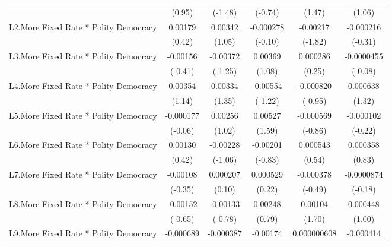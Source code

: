 {\begin{longtable}{l*{5}{c}}
                &   (0.95)         &  (-1.48)         &  (-0.74)         &   (1.47)         &   (1.06)         \\
[1em]
L2.More Fixed Rate * Polity Democracy&  0.00179         &  0.00342         &-0.000278         & -0.00217         &-0.000216         \\
                &   (0.42)         &   (1.05)         &  (-0.10)         &  (-1.82)         &  (-0.31)         \\
[1em]
L3.More Fixed Rate * Polity Democracy& -0.00156         & -0.00372         &  0.00369         & 0.000286         &-0.0000455         \\
                &  (-0.41)         &  (-1.25)         &   (1.08)         &   (0.25)         &  (-0.08)         \\
[1em]
L4.More Fixed Rate * Polity Democracy&  0.00354         &  0.00334         & -0.00554         &-0.000820         & 0.000638         \\
                &   (1.14)         &   (1.35)         &  (-1.22)         &  (-0.95)         &   (1.32)         \\
[1em]
L5.More Fixed Rate * Polity Democracy&-0.000177         &  0.00256         &  0.00527         &-0.000569         &-0.000102         \\
                &  (-0.06)         &   (1.02)         &   (1.59)         &  (-0.86)         &  (-0.22)         \\
[1em]
L6.More Fixed Rate * Polity Democracy&  0.00130         & -0.00228         & -0.00201         & 0.000543         & 0.000358         \\
                &   (0.42)         &  (-1.06)         &  (-0.83)         &   (0.54)         &   (0.83)         \\
[1em]
L7.More Fixed Rate * Polity Democracy& -0.00108         & 0.000207         & 0.000529         &-0.000378         &-0.0000874         \\
                &  (-0.35)         &   (0.10)         &   (0.22)         &  (-0.49)         &  (-0.18)         \\
[1em]
L8.More Fixed Rate * Polity Democracy& -0.00152         & -0.00133         &  0.00248         &  0.00104         & 0.000448         \\
                &  (-0.65)         &  (-0.78)         &   (0.79)         &   (1.70)         &   (1.00)         \\
[1em]
L9.More Fixed Rate * Polity Democracy&-0.000689         &-0.000387         & -0.00174         &0.000000608         &-0.000414         \\

\end{longtable}}
